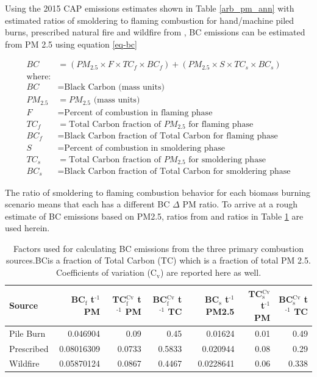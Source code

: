 \documentclass[a4paper]{article}
\begin{document}
Using the 2015 \ac{CAP} emissions estimates shown in Table \ref{arb_pm_ann} with estimated ratios of smoldering to flaming combustion for hand/machine piled burns, prescribed natural fire and wildfire from \citet{Ward1989}, \ac{BC} emissions can be estimated from PM 2.5 using equation \eqref{eq-bc}


\begin{align}
BC &= \left( PM_{2.5} \times F \times TC_f \times BC_f\right) + \left( PM_{2.5} \times S \times TC_s \times BC_s\right) \label{eq-bc} \\
\text{where:} \nonumber \\
BC &= \text{Black Carbon (mass units)} \nonumber \\
PM_{2.5} &= PM_{2.5} \text{ (mass units)} \nonumber \\
F &= \text{Percent of combustion in flaming phase} \nonumber \\
TC_f &= \text{Total Carbon fraction of } PM_{2.5} \text{ for flaming phase} \nonumber \\
BC_f &= \text{Black Carbon fraction of Total Carbon for flaming phase} \nonumber \\
S &= \text{Percent of combustion in smoldering phase} \nonumber \\
TC_s &= \text{Total Carbon fraction of } PM_{2.5} \text{ for smoldering phase} \nonumber \\
BC_s &= \text{Black Carbon fraction of Total Carbon for smoldering phase} \nonumber
\end{align}

The ratio of smoldering to flaming combustion behavior for each biomass burning scenario means that each has a different \ac{BC} \(\Delta\) \ac{PM}
ratio. To arrive at a rough estimate of \ac{BC} emissions based on PM2.5, ratios from  \citet{Ward1989} and \citet{Jenk1996} ratios in Table \ref{tab:bc_pm} are used herein.
\begin{table}[htb]
\centering
\begin{tabular}{lrrrrrr}
Source & BC\(_{\text{f}}\) t\(^{\text{-1}}\) PM & TC\(_{\text{f}}^{\text{Cv}}\) t\(^{\text{-1}}\) PM & BC\(_{\text{f}}^{\text{Cv}}\) t\(^{\text{-1}}\) TC & BC\(_{\text{s}}\) t\(^{\text{-1}}\) PM2.5 & TC\(_{\text{s}}^{\text{Cv}}\) t\(^{\text{-1}}\) PM & BC\(_{\text{s}}^{\text{Cv}}\) t\(^{\text{-1}}\) TC\\
\hline
Pile Burn & 0.046904 & 0.09 & 0.45 & 0.01624 & 0.01 & 0.49\\
Prescribed & 0.08016309 & 0.0733 & 0.5833 & 0.020944 & 0.08 & 0.29\\
Wildfire & 0.05870124 & 0.0867 & 0.4467 & 0.0228641 & 0.06 & 0.338\\
\end{tabular}
\caption{Factors used for calculating \ac{BC} emissions from the three primary combustion sources.\ac{BC}is a fraction of Total Carbon (TC) which is a fraction of total PM 2.5. Coefficients of variation (C\(_{\text{v}}\)) are reported here as well. \label{tab:bc_pm}}

\end{table}
\end{document}
